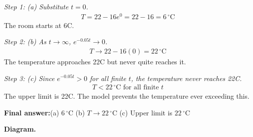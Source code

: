 \documentclass[11pt]{article}
\begin{document}
\textit{Step 1: (a) Substitute \( t = 0 \).}
\[\begin{gathered}
T = 22 - 16e^0 = 22 - 16 = 6\,^\circ\!\text{C}
\end{gathered}\]
The room starts at 6\textdegree C.

\textit{Step 2: (b) As \( t \to \infty \), \( e^{-0.05t} \to 0 \).}
\[\begin{gathered}
T \to 22 - 16(0) = 22\,^\circ\!\text{C}
\end{gathered}\]
The temperature approaches 22\textdegree C but never quite reaches it.

\textit{Step 3: (c) Since \( e^{-0.05t} > 0 \) for all finite \( t \), the temperature never reaches 22\textdegree C.}
\[\begin{gathered}
T < 22\,^\circ\!\text{C} \text{ for all finite } t
\end{gathered}\]
The upper limit is 22\textdegree C. The model prevents the temperature ever exceeding this.

\begin{answerbox}
\textbf{Final answer:}\quad (a) \(\displaystyle  6\,^\circ\!\text{C} \) \quad  (b) \(\displaystyle  T \to 22\,^\circ\!\text{C} \) \quad  (c) Upper limit is \(\displaystyle  22\,^\circ\!\text{C} \)
\end{answerbox}
\textbf{Diagram.}
\end{document}
